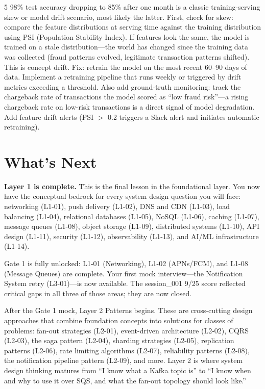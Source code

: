 \documentclass[11pt,a4paper]{article}
\begin{document}
\begin{answerbox}{5}
98\% test accuracy dropping to 85\% after one month is a classic training-serving skew or model drift scenario, most likely the latter. First, check for skew: compare the feature distributions at serving time against the training distribution using PSI (Population Stability Index). If features look the same, the model is trained on a stale distribution---the world has changed since the training data was collected (fraud patterns evolved, legitimate transaction patterns shifted). This is concept drift. Fix: retrain the model on the most recent 60--90 days of data. Implement a retraining pipeline that runs weekly or triggered by drift metrics exceeding a threshold. Also add ground-truth monitoring: track the chargeback rate of transactions the model scored as ``low fraud risk''---a rising chargeback rate on low-risk transactions is a direct signal of model degradation. Add feature drift alerts (PSI $>$ 0.2 triggers a Slack alert and initiates automatic retraining).
\end{answerbox}

\newpage
\section{What's Next}

\begin{insightbox}
\textbf{Layer 1 is complete.} This is the final lesson in the foundational layer. You now have the conceptual bedrock for every system design question you will face: networking (L1-01), push delivery (L1-02), DNS and CDN (L1-03), load balancing (L1-04), relational databases (L1-05), NoSQL (L1-06), caching (L1-07), message queues (L1-08), object storage (L1-09), distributed systems (L1-10), API design (L1-11), security (L1-12), observability (L1-13), and AI/ML infrastructure (L1-14).

Gate 1 is fully unlocked: L1-01 (Networking), L1-02 (APNs/FCM), and L1-08 (Message Queues) are complete. Your first mock interview---the Notification System retry (L3-01)---is now available. The session\_001 9/25 score reflected critical gaps in all three of those areas; they are now closed.

After the Gate 1 mock, Layer 2 Patterns begins. These are cross-cutting design approaches that combine foundation concepts into solutions for classes of problems: fan-out strategies (L2-01), event-driven architecture (L2-02), CQRS (L2-03), the saga pattern (L2-04), sharding strategies (L2-05), replication patterns (L2-06), rate limiting algorithms (L2-07), reliability patterns (L2-08), the notification pipeline pattern (L2-09), and more. Layer 2 is where system design thinking matures from ``I know what a Kafka topic is'' to ``I know when and why to use it over SQS, and what the fan-out topology should look like.''
\end{insightbox}
\end{document}
